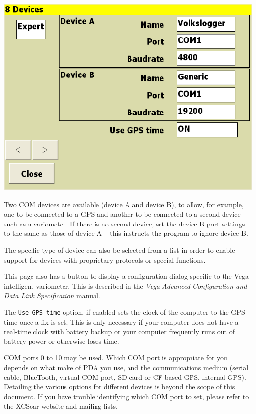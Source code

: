 \documentclass[a4paper,12pt]{refrep}
\begin{document}
\begin{center}
\includegraphics[angle=0,width=\linewidth,keepaspectratio='true']{figures/config-6.png}
\end{center}

Two COM devices are available (device A and device B), to allow, for
example, one to be connected to a GPS and another to be connected to a
second device such as a variometer.  If there is no second device, set
the device B port settings to the same as those of device A -- this
instructs the program to ignore device B.

The specific type of device can also be selected from a list in order
to enable support for devices with proprietary protocols or special
functions.

This page also has a  button to display a
configuration dialog specific to the Vega intelligent variometer.
This is described in the {\em Vega Advanced Configuration and Data
Link Specification} manual.

The \verb|Use GPS time| option, if enabled sets the clock of the computer
to the GPS time once a fix is set.  This is only necessary if your computer
does not have a real-time clock with battery backup or your computer frequently
runs out of battery power or otherwise loses time.

COM ports 0 to 10 may be used.  Which COM port is appropriate for you
depends on what make of PDA you use, and the communications medium
(serial cable, BlueTooth, virtual COM port, SD card or CF based GPS,
internal GPS).  Detailing the various options for different devices is
beyond the scope of this document.  If you have trouble identifying
which COM port to set, please refer to the XCSoar website and mailing
lists.
\end{document}
